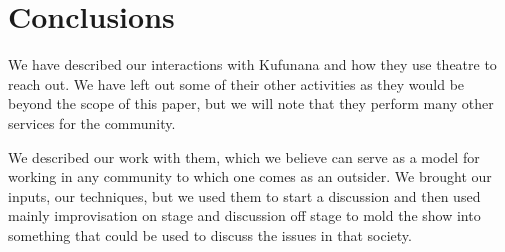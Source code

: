 \documentclass[article,twocolumn]{memoir}
\begin{document}
\chapter{Conclusions}

We have described our interactions with Kufunana and how they use theatre to
reach out. We have left out some of their other activities as they would be
beyond the scope of this paper, but we will note that they perform many other
services for the community.

We described our work with them, which we believe can serve as a model for
working in any community to which one comes as an outsider. We brought our
inputs, our techniques, but we used them to start a discussion and then used
mainly improvisation on stage and discussion off stage to mold the show into
something that could be used to discuss the issues in that society.
\end{document}
